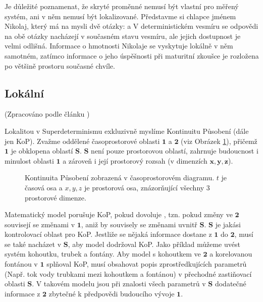 Je důležité poznamenat, že skryté proměnné nemusí být vlastní pro měřený systém, ani v něm nemusí být lokalizované. Představme si chlapce jménem Nikolaj, který má na mysli dvě otázky:  a  V deterministickém vesmíru se odpovědi na obě otázky nacházejí v současném stavu vesmíru, ale jejich dostupnost je velmi odlišná. Informace o hmotnosti Nikolaje se vyskytuje lokálně v něm samotném, zatímco informace o jeho úspěšnosti při maturitní zkoušce je rozložena po většině prostoru současné chvíle.

\subsection{Lokální}
(Zpracováno podle článku \cite{CoA})

Lokalitou v Superdeterminismu exkluzivně myslíme Kontinuitu Působení (dále jen KoP). Zvažme oddělené časoprostorové oblasti $\bm{1}$ a $\bm{2}$ (viz Obrázek \ref{fig:7}), přičemž $\bm{1}$ je obklopena  oblastí $\bm{S}$. $\bm{S}$ není pouze prostorovou oblastí, zahrnuje budoucnost i minulost oblasti $\bm{1}$ a zároveň i její prostorový rozsah (v dimenzích $\bm{x,y,z}$).

\begin{figure}[ht]

    \centering

    \caption{\label{fig:7}Kontinuita Působení zobrazená v časoprostorovém diagramu. $t$ je časová osa a $x,y,z$ je prostorová osa, znázorňující všechny 3 prostorové dimenze.}
\end{figure}

Matematický model porušuje KoP, pokud dovoluje , tzn. pokud změny ve $\bm{2}$ souvisejí se změnami v $\bm{1}$, aniž by souvisely se změnami uvnitř $\bm{S}$. $\bm{S}$ je jakási kontrolovací oblast pro KoP. Jestliže se nějaká informace dostane z $\bm{1}$ do $\bm{2}$, musí se také nacházet v $\bm{S}$, aby model dodržoval KoP. Jako příklad můžeme uvést systém kohoutku, trubek a fontány. Aby model s kohoutkem ve $\bm{2}$ a korelovanou fontánou v $\bm{1}$ splňoval KoP, musí obsahovat popis zprostředkujících parametrů (Např. tok vody trubkami mezi kohoutkem a fontánou) v přechodné zastiňovací oblasti $\bm{S}$. V takovém modelu jsou při znalosti všech parametrů v $\bm{S}$ dodatečné informace z $\bm{2}$ zbytečné k předpovědi budoucího vývoje $\bm{1}$.

